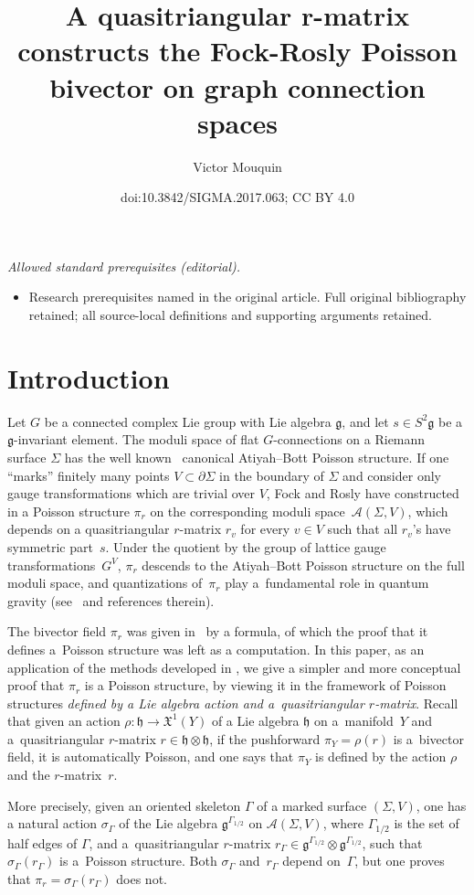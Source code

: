 \documentclass[10pt,a4paper]{amsart}
\title{A quasitriangular r-matrix constructs the Fock-Rosly Poisson bivector on graph connection spaces}
\author{Victor Mouquin}
\date{doi:10.3842/SIGMA.2017.063; CC BY 4.0}
\numberwithin{equation}{section}
\newcommand{\XX}{\mathfrak{X}}
\def \g {\mathfrak{a}}
\def \g {\mathfrak{g}}
\def \h {\mathfrak{h}}
\def \A {{\mathcal{A}}}
\def \sGam {{\scriptscriptstyle \Gamma}}
\newcommand{\del}{\partial}
\newcommand{\piY}{{\pi_{\scriptscriptstyle Y}}}
\begin{document}
\maketitle
\noindent\textit{Allowed standard prerequisites (editorial).}\begin{itemize}
\item Research prerequisites named in the original article. Full original bibliography retained; all source-local definitions and supporting arguments retained.
\end{itemize}\medskip
\section{Introduction}\label{intro}

Let $G$ be a connected complex Lie group with Lie algebra $\g$, and let $s \in S^2\g$ be a $\g$-invariant element. The moduli space of f\/lat $G$-connections on a Riemann surface $\Sigma$ has the well known~\cite{AB} canonical Atiyah--Bott Poisson structure. If one ``marks'' f\/initely many points $V \subset \del \Sigma$ in the boundary of $\Sigma$ and consider only gauge transformations which are trivial over $V$, Fock and Rosly have constructed in \cite{FR2, FR1} a Poisson structure $\pi_r$ on the corresponding moduli space~$\A(\Sigma, V)$, which depends on a quasitriangular $r$-matrix $r_v$ for every $v \in V$ such that all $r_v$'s have symmetric part~$s$. Under the quotient by the group of lattice gauge transformations~$G^V$, $\pi_r$ descends to the Atiyah--Bott Poisson structure on the full moduli space, and quantizations of~$\pi_r$ play a~fundamental role in quantum gravity (see~\cite{physics1} and references therein).

The bivector f\/ield $\pi_r$ was given in~\cite{FR2, FR1} by a formula, of which the proof that it def\/ines a~Poisson structure was left as a computation. In this paper, as an application of the methods developed in \cite{Lu-Mou:mixed}, we give a simpler and more conceptual proof that $\pi_r$ is a Poisson structure, by viewing it in the framework of Poisson structures {\it defined by a Lie algebra action and a~quasitriangular $r$-matrix}. Recall that given an action $\rho\colon \h \to \XX^1(Y)$ of a Lie algebra $\h$ on a~mani\-fold~$Y$ and a~quasitriangular $r$-matrix $r \in \h \otimes \h$, if the pushforward $\piY= \rho(r)$ is a~bivector f\/ield, it is automatically Poisson, and one says that $\piY$ is def\/ined by the action $\rho$ and the $r$-mat\-rix~$r$.

More precisely, given an oriented skeleton $\Gamma$ of a marked surface $(\Sigma, V)$, one has a natural action $\sigma_\sGam$ of the Lie algebra $\g^{\sGam_{1/2}}$ on $\A(\Sigma, V)$, where $\Gamma_{1/2}$ is the set of half edges of $\Gamma$, and a~quasitriangular $r$-matrix $r_\sGam \in \g^{\sGam_{1/2}} \otimes \g^{\sGam_{1/2}}$, such that $\sigma_\sGam(r_\sGam)$ is a~Poisson structure. Both $\sigma_\sGam$ and~$r_\sGam$ depend on~$\Gamma$, but one proves that $\pi_r = \sigma_\sGam(r_\sGam)$ does not.
\end{document}
